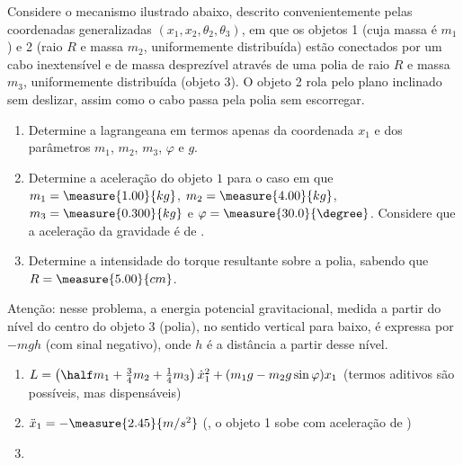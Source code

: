 \begin{question}
	Considere o mecanismo ilustrado abaixo, descrito convenientemente pelas coordenadas generalizadas $(x_1, x_2, \theta_2, \theta_3)$, em que os objetos 1 (cuja massa é $m_1$) e 2 (raio $R$ e massa $m_2$, uniformemente distribuída) estão conectados por um cabo inextensível e de massa desprezível através de uma polia de raio $R$ e massa $m_3$, uniformemente distribuída (objeto 3).
	O objeto 2 rola pelo plano inclinado sem deslizar, assim como o cabo passa pela polia sem escorregar.

	\begin{enumerate}
		\item Determine a lagrangeana em termos apenas da coordenada $x_1$ e dos parâmetros $m_1$, $m_2$, $m_3$, $\varphi$ e $g$.
		\item Determine a aceleração do objeto $1$ para o caso em que $m_1 = \measure{1.00}{kg}$, $m_2 = \measure{4.00}{kg}$, $m_3 = \measure{0.300}{kg}$ e $\varphi = \measure{30.0}{\degree}$. %
		Considere que a aceleração da gravidade é de .		
		\item Determine a intensidade do torque resultante sobre a polia, sabendo que $R = \measure{5.00}{cm}$. %
	\end{enumerate}


	\begin{compactdesc}
		\item[Atenção:] nesse problema, a energia potencial gravitacional, medida a partir do nível do centro do objeto 3 (polia), no sentido vertical para baixo, é expressa por $-mgh$ (com sinal negativo), onde $h$ é a distância a partir desse nível.
	\end{compactdesc}

	\begin{answer}
		\begin{enumerate}
			\item $L = \left(\half m_1 + \frac{3}{4}m_2 + \frac{1}{4}m_3\right)\dot x_1^2 + (m_1 g - m_2 g \sin\varphi)x_1$ (termos aditivos são possíveis, mas dispensáveis)
			\item $\ddot x_1 = -\measure{2.45}{m/s^2}$ (\ie, o objeto 1 sobe com aceleração de ) %
			\item {} %
		\end{enumerate}
	\end{answer}


\end{question}
